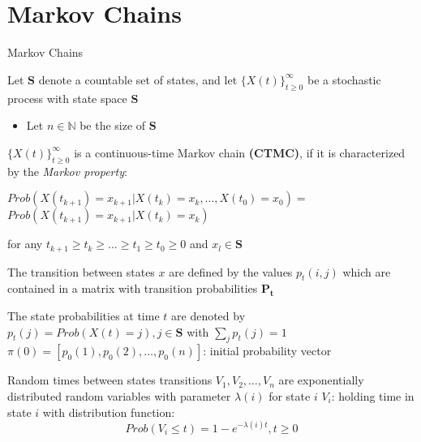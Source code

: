\documentclass[envcountset]{beamer}
\theoremstyle{definition}
\begin{document}
\section{Markov Chains}

\begin{frame}{Markov Chains}

Let $\mathbf{S}$ denote a countable set of states, and let $\{X(t)\}_{t\geq0}^{\infty}$ be a stochastic process with state space $\mathbf{S}$

	\begin{itemize}
	\item Let $n \in \mathbb{N}$ be the size of $\mathbf{S}$
	\end{itemize}

$\{X(t)\}_{t\geq0}^{\infty}$ is a continuous-time Markov chain \textbf{(CTMC)}, if it is characterized by the \textit{Markov property}: 
\\[10pt]
\centering
\begin{framed}
	$Prob(X(t_{k+1})=  x_{k+1} | X(t_k) = x_k, \ldots, X(t_0) = x_0) =$
	\\[4pt]
	$Prob(X(t_{k+1}) = x_{k+1} | X(t_k) = x_k)$
\end{framed}

for any $t_{k+1} \geq t_{k} \geq \ldots \geq t_1 \geq t_0 \geq 0 $ and $x_l \in \mathbf{S}$
\end{frame}

\begin{frame}{}

The transition between states $x$ are defined by the values $p_t(i,j)$ which are contained in a matrix with transition probabilities $\mathbf{P_t}$
\\[10pt]
\begin{framed}
The state probabilities at time $t$ are denoted by 
\\[5pt]
\centering
$p_t(j) = Prob(X(t) = j), j \in \mathbf{S}$ with $\sum_j p_t(j)=1$
\\[10pt]
$\pi(0) = [ p_0(1), p_0(2), \ldots, p_0(n)]$: initial probability vector 
\end{framed}
\centering
\flushleft
Random times between states transitions $V_1, V_2, \ldots, V_n$ are exponentially distributed random variables with parameter $\lambda(i)$ for state $i$
\flushleft
$V_i$: holding time in state $i$ with distribution function:
$$Prob(V_i \leq t) = 1 - e^{-\lambda(i)t}, t \geq 0$$
\end{frame}
\end{document}

